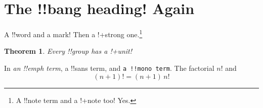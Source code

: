 \documentclass{article}
\newtheorem{theorem}{Theorem}
\begin{document}
\section{The !!{bang} heading! Again}
A !!{word} and a mark! Then a !+{strong} one.\footnote{A !!{note} term and a !+{note} too! Yes.}
\begin{theorem}
Every !!{group} has a !+{unit}!
\end{theorem}
In \emph{an !!{emph} term}, \textsf{a !!{sans} term}, and \texttt{a !!{mono} term}.
The factorial $n!$ and
\[ (n+1)! = (n+1)\,n! \]
\end{document}
